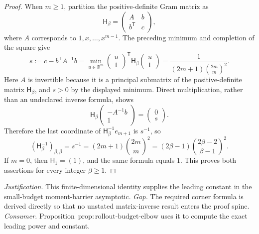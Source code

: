 \documentclass{article}
\begin{document}
\begin{proof}
When \(m\ge1\), partition the positive-definite Gram matrix as
\[
\mathsf H_\beta=
\begin{pmatrix}
A&b\\
b^{\mathsf T}&c
\end{pmatrix},
\]
where \(A\) corresponds to \(1,x,\ldots,x^{m-1}\).  The preceding minimum and completion of the square give
\[
s:=c-b^{\mathsf T}A^{-1}b
=\min_{u\in\mathbb R^m}
\begin{pmatrix}u\\1\end{pmatrix}^{\!\mathsf T}
\mathsf H_\beta
\begin{pmatrix}u\\1\end{pmatrix}
=\frac{1}{(2m+1)\binom{2m}{m}^{2}}.
\]
Here \(A\) is invertible because it is a principal submatrix of the positive-definite matrix \(\mathsf H_\beta\), and \(s>0\) by the displayed minimum.  Direct multiplication, rather than an undeclared inverse formula, shows
\[
\mathsf H_\beta
\begin{pmatrix}-A^{-1}b\\1\end{pmatrix}
=
\begin{pmatrix}0\\s\end{pmatrix}.
\]
Therefore the last coordinate of \(\mathsf H_\beta^{-1}e_{m+1}\) is \(s^{-1}\), so
\[
(\mathsf H_\beta^{-1})_{\beta,\beta}
=s^{-1}
=(2m+1)\binom{2m}{m}^{2}
=(2\beta-1)\binom{2\beta-2}{\beta-1}^{\!2}.
\]
If \(m=0\), then \(\mathsf H_1=(1)\), and the same formula equals \(1\).  This proves both assertions for every integer \(\beta\ge1\).
\end{proof}
\par\smallskip\noindent \textit{Justification.} This finite-dimensional identity supplies the leading constant in the small-budget moment-barrier asymptotic. \textit{Gap.} The required corner formula is derived directly so that no unstated matrix-inverse result enters the proof spine. \textit{Consumer.} Proposition~\(\mathrm{prop{:}rollout\text{-}budget\text{-}elbow}\) uses it to compute the exact leading power and constant.
\end{document}
